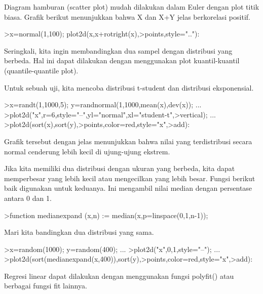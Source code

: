 \documentclass[a4paper,10pt]{article}
\begin{document}
\begin{eulernotebook}
\begin{eulercomment}
Diagram hamburan (scatter plot) mudah dilakukan dalam Euler dengan
plot titik biasa. Grafik berikut menunjukkan bahwa X dan X+Y jelas
berkorelasi positif.
\end{eulercomment}
\begin{eulerprompt}
>x=normal(1,100); plot2d(x,x+rotright(x),>points,style=".."):
\end{eulerprompt}
\begin{eulercomment}
Seringkali, kita ingin membandingkan dua sampel dengan distribusi yang
berbeda. Hal ini dapat dilakukan dengan menggunakan plot
kuantil-kuantil (quantile-quantile plot).

Untuk sebuah uji, kita mencoba distribusi t-student dan distribusi
eksponensial.
\end{eulercomment}
\begin{eulerprompt}
>x=randt(1,1000,5); y=randnormal(1,1000,mean(x),dev(x)); ...
>plot2d("x",r=6,style="--",yl="normal",xl="student-t",>vertical); ...
>plot2d(sort(x),sort(y),>points,color=red,style="x",>add):
\end{eulerprompt}
\begin{eulercomment}
Grafik tersebut dengan jelas menunjukkan bahwa nilai yang
terdistribusi secara normal cenderung lebih kecil di ujung-ujung
ekstrem.

Jika kita memiliki dua distribusi dengan ukuran yang berbeda, kita
dapat memperbesar yang lebih kecil atau mengecilkan yang lebih besar.
Fungsi berikut baik digunakan untuk keduanya. Ini mengambil nilai
median dengan persentase antara 0 dan 1.
\end{eulercomment}
\begin{eulerprompt}
>function medianexpand (x,n) := median(x,p=linspace(0,1,n-1));
\end{eulerprompt}
\begin{eulercomment}
Mari kita bandingkan dua distribusi yang sama.
\end{eulercomment}
\begin{eulerprompt}
>x=random(1000); y=random(400); ...
>plot2d("x",0,1,style="--"); ...
>plot2d(sort(medianexpand(x,400)),sort(y),>points,color=red,style="x",>add):
\end{eulerprompt}
\begin{eulercomment}
Regresi linear dapat dilakukan dengan menggunakan fungsi polyfit()
atau berbagai fungsi fit lainnya.


\end{eulercomment}
\end{eulernotebook}
\end{document}
